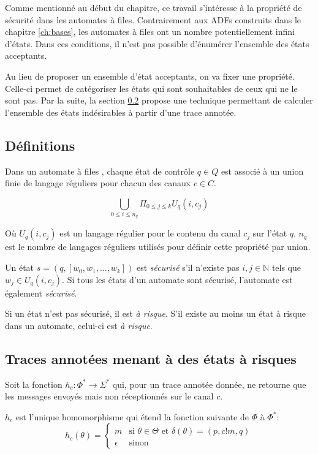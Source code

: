 Comme mentionné au début du chapitre, ce travail s'intéresse à la propriété de sécurité dans les automates à files. Contrairement aux ADFs construits dans le chapitre \ref{ch:bases}, les automates à files ont un nombre potentiellement infini d'états. Dans ces conditions, il n'est pas possible d'énumérer l'ensemble des états acceptants.

Au lieu de proposer un ensemble d'état acceptants, on va fixer une propriété. Celle-ci permet de catégoriser les états qui sont souhaitables de ceux qui ne le sont pas. Par la suite, la section \ref{ss:tracesafety} propose une technique permettant de calculer l'ensemble des états indésirables à partir d'une trace annotée.


\subsection{Définitions}
Dans un automate à files \fifo, chaque état de contrôle $q\in Q$ est associé à un union finie de langage réguliers pour chacun des canaux $c\in C$.


$$\bigcup_{0 \leq i \leq n_q}\Pi_{0 \leq j \leq k}U_q(i,c_j)$$

Où $U_q(i,c_j)$ est un langage régulier pour le contenu du canal $c_j$ sur l'état $q$. $n_q$ est le nombre de langages réguliers utilisés pour définir cette propriété par union.

Un état $s=(q,[w_0,w_1,\dots,w_k])$ est \emph{sécurisé} s'il n'existe pas $i,j \in \mathbb{N}$ tels que $w_j \in U_q(i,c_j)$. Si tous les états d'un automate sont sécurisé, l'automate est également \emph{sécurisé}.

Si un état n'est pas sécurisé, il est \emph{à risque}. S'il existe au moins un état à risque dans un automate, celui-ci est \emph{à risque}.



\subsection{Traces annotées menant à des états à risques}\label{ss:tracesafety}

Soit la fonction $h_c:\Phi^*\rightarrow\Sigma^*$ qui, pour un trace annotée donnée, ne retourne que les messages envoyés mais non réceptionnés sur le canal $c$.

$h_c$ est l'unique homomorphisme qui étend la fonction suivante de $\Phi$ à $\Phi^*$:
$$ h_c(\theta) = \left\{ \begin{array}{ll}
      m & \text{si } \theta\in\Theta\text{ et }\delta(\theta)=(p,c!m,q)\\
      \epsilon & \text{sinon}\end{array} \right. $$



